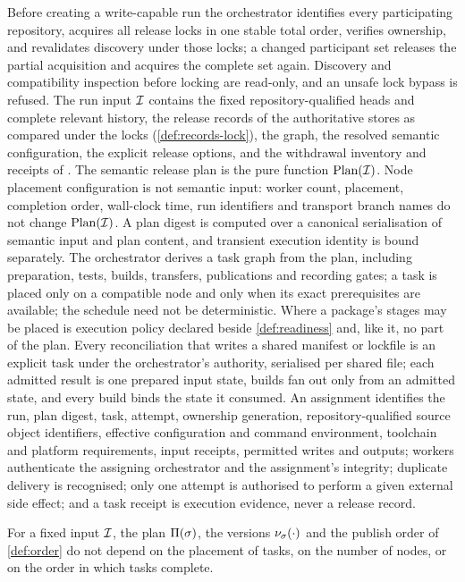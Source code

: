 \begin{definition}
\label{def:exec-input}
Before creating a write-capable run the orchestrator identifies every
participating repository, acquires all release locks in one stable total
order, verifies ownership, and revalidates discovery under those locks; a
changed participant set releases the partial acquisition and acquires the
complete set again. Discovery and compatibility inspection before locking are
read-only, and an unsafe lock bypass is refused. The run input $\mathcal{I}$ contains
the fixed repository-qualified heads and complete relevant history, the release
records of the authoritative stores as compared under the locks
(\cref{def:records-lock}), the graph, the resolved semantic configuration, the
explicit release options, and the withdrawal inventory and receipts of
. The semantic release plan is the pure function $\mathrm{Plan}(\mathcal{I})$.
Node placement configuration is not semantic input: worker count, placement,
completion order, wall-clock time, run identifiers and transport branch names
do not change $\mathrm{Plan}(\mathcal{I})$. A plan digest is computed over a canonical
serialisation of semantic input and plan content, and transient execution
identity is bound separately. The orchestrator derives a task graph from the
plan, including preparation, tests, builds, transfers, publications and
recording gates; a task is placed only on a compatible node and only when its
exact prerequisites are available; the schedule need not be deterministic.
Where a package's stages may be placed is execution policy declared beside
\cref{def:readiness} and, like it, no part of the plan. Every reconciliation
that writes a shared manifest or lockfile is an explicit task under the
orchestrator's authority, serialised per shared file; each admitted result is
one prepared input state, builds fan out only from an admitted state, and
every build binds the state it consumed. An assignment identifies the run,
plan digest, task, attempt, ownership generation, repository-qualified source
object identifiers, effective configuration and command environment,
toolchain and platform requirements, input receipts, permitted writes and
outputs; workers authenticate the assigning orchestrator and the assignment's
integrity; duplicate delivery is recognised; only one attempt is authorised
to perform a given external side effect; and a task receipt is execution
evidence, never a release record.
\end{definition}

\begin{proposition}
\label{prop:exec-placement}
For a fixed input $\mathcal{I}$, the plan $\Pi(\sigma)$, the versions
$\nu_{\sigma}(\cdot)$ and the publish order of \cref{def:order} do not depend on
the placement of tasks, on the number of nodes, or on the order in which tasks
complete.
\end{proposition}


